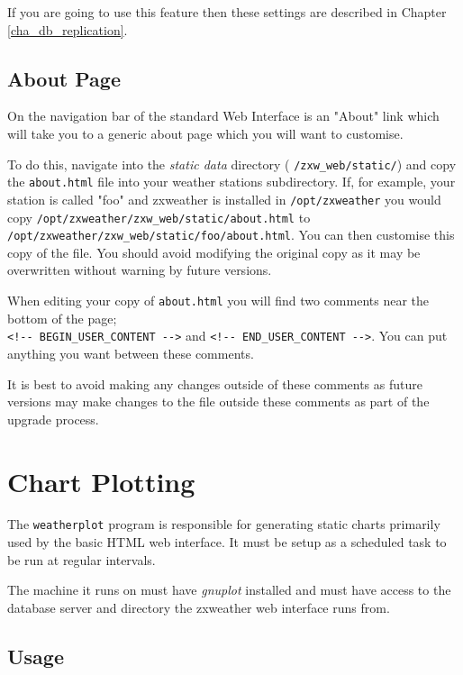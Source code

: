 \documentclass[a4paper,10pt,draft]{book}
\begin{document}
If you are going to use this feature then these settings are described in Chapter \ref{cha_db_replication}.

\subsection{About Page}
On the navigation bar of the standard Web Interface is an "About" link which will take you to a generic about page which you will want to customise.

To do this, navigate into the \emph{static data} directory ( \verb|/zxw_web/static/|) and copy the \verb|about.html| file into your weather stations subdirectory. If, for example, your station is called "foo" and zxweather is installed in \verb|/opt/zxweather| you would copy \verb|/opt/zxweather/zxw_web/static/about.html| to \\ \verb|/opt/zxweather/zxw_web/static/foo/about.html|. You can then customise this copy of the file. You should avoid modifying the original copy as it may be overwritten without warning by future versions.

When editing your copy of \verb|about.html| you will find two comments near the bottom of the page; \\
\verb|<!-- BEGIN_USER_CONTENT -->| and \verb|<!-- END_USER_CONTENT -->|. You can put anything you want between these comments.

It is best to avoid making any changes outside of these comments as future versions may make changes to the file outside these comments as part of the upgrade process.


\section{Chart Plotting}
\label{sec_chart_plotting}

The \verb|weatherplot| program is responsible for generating static charts primarily used by the basic HTML web interface. It must be setup as a scheduled task to be run at regular intervals.

The machine it runs on must have \emph{gnuplot} installed and must have access to the database server and directory the zxweather web interface runs from.

\subsection{Usage}
\end{document}
